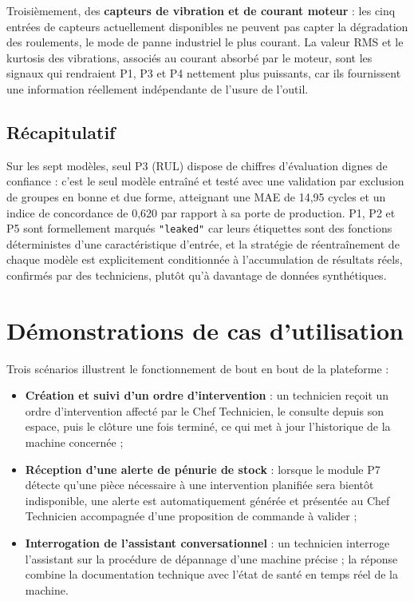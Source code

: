 Troisièmement, des \textbf{capteurs de vibration et de courant moteur} : les cinq entrées de capteurs actuellement disponibles ne peuvent pas capter la dégradation des roulements, le mode de panne industriel le plus courant. La valeur RMS et le kurtosis des vibrations, associés au courant absorbé par le moteur, sont les signaux qui rendraient P1, P3 et P4 nettement plus puissants, car ils fournissent une information réellement indépendante de l'usure de l'outil.

\subsection{Récapitulatif}

Sur les sept modèles, seul P3 (RUL) dispose de chiffres d'évaluation dignes de confiance : c'est le seul modèle entraîné et testé avec une validation par exclusion de groupes en bonne et due forme, atteignant une MAE de 14,95 cycles et un indice de concordance de 0,620 par rapport à sa porte de production. P1, P2 et P5 sont formellement marqués \texttt{"leaked"} car leurs étiquettes sont des fonctions déterministes d'une caractéristique d'entrée, et la stratégie de réentraînement de chaque modèle est explicitement conditionnée à l'accumulation de résultats réels, confirmés par des techniciens, plutôt qu'à davantage de données synthétiques.

\section{Démonstrations de cas d'utilisation}

Trois scénarios illustrent le fonctionnement de bout en bout de la plateforme :
\begin{itemize}
\item \textbf{Création et suivi d'un ordre d'intervention} : un technicien reçoit un ordre d'intervention affecté par le Chef Technicien, le consulte depuis son espace, puis le clôture une fois terminé, ce qui met à jour l'historique de la machine concernée ;
\item \textbf{Réception d'une alerte de pénurie de stock} : lorsque le module P7 détecte qu'une pièce nécessaire à une intervention planifiée sera bientôt indisponible, une alerte est automatiquement générée et présentée au Chef Technicien accompagnée d'une proposition de commande à valider ;
\item \textbf{Interrogation de l'assistant conversationnel} : un technicien interroge l'assistant sur la procédure de dépannage d'une machine précise ; la réponse combine la documentation technique avec l'état de santé en temps réel de la machine.
\end{itemize}

